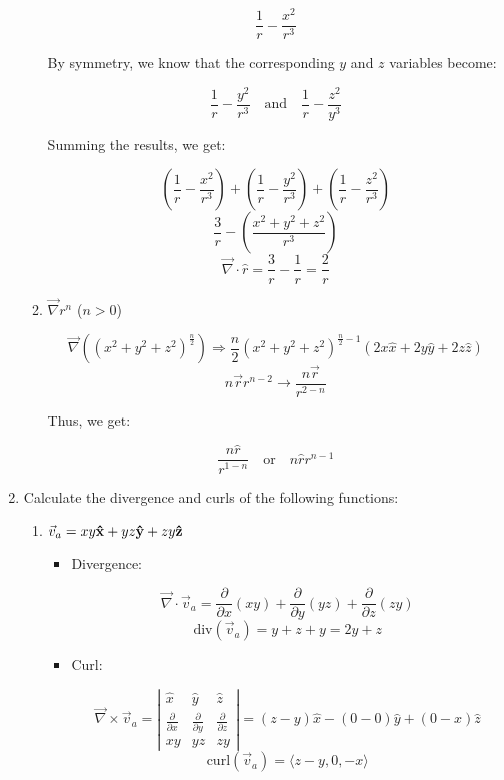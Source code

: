 \begin{enumerate}
\begin{enumerate}
        $$\frac{1}{r}-\frac{x^2}{r^3}$$

        By symmetry, we know that the corresponding $y$ and $z$ variables become:

        $$\frac{1}{r}-\frac{y^2}{r^3}\quad\text{and}\quad\frac{1}{r}-\frac{z^2}{y^3}$$

        Summing the results, we get:

        $$\left( \frac{1}{r}-\frac{x^2}{r^3} \right)+\left( \frac{1}{r}-\frac{y^2}{r^3} \right)+\left( \frac{1}{r}-\frac{z^2}{r^3} \right)$$
        $$\frac{3}{r}-\left( \frac{x^2+y^2+z^2}{r^3} \right)$$
        $$\boxed{\vec{\nabla}\cdot\hat{r}=\frac{3}{r}-\frac{1}{r}=\frac{2}{r}}$$

      \item $\vec{\nabla}r^n$ ($n>0$)

        $$\vec{\nabla}((x^2+y^2+z^2)^\frac{n}{2})\Rightarrow \frac{n}{2}(x^2+y^2+z^2)^{\frac{n}{2}-1}\left( 2x\hat{x}+2y\hat{y}+2z\hat{z} \right)$$
        $$n\vec{r}r^{n-2}\rightarrow \frac{n\vec{r}}{r^{2-n}}$$

        Thus, we get:

        $$\boxed{\frac{n\hat{r}}{r^{1-n}}\quad\text{or}\quad n\hat{r}r^{n-1}}$$

    \end{enumerate}

  \item Calculate the divergence and curls of the following functions:

    \begin{enumerate}

      \item $\vec{v}_a=xy\bold{\hat{x}}+yz\bold{\hat{y}}+zy\bold{\hat{z}}$

        \begin{itemize}

          \item Divergence:

            $$\vec{\nabla}\cdot \vec{v}_a=\frac{\partial}{\partial x}(xy)+\frac{\partial}{\partial y}(yz)+\frac{\partial}{\partial z}(zy)$$
            $$\boxed{\text{div}(\vec{v}_a)=y+z+y=2y+z}$$

          \item Curl:

            $$\vec{\nabla}\times\vec{v}_a=\left|\begin{matrix} \hat{x} & \hat{y} & \hat{z}\\ \frac{\partial}{\partial x} & \frac{\partial}{\partial y} & \frac{\partial}{\partial z} \\ xy & yz & zy \end{matrix}\right|=(z-y)\hat{x}-(0-0)\hat{y}+(0-x)\hat{z}$$
            $$\boxed{\text{curl}(\vec{v}_a)=\langle z-y, 0, -x\rangle}$$


\end{itemize}
\end{enumerate}
\end{enumerate}
